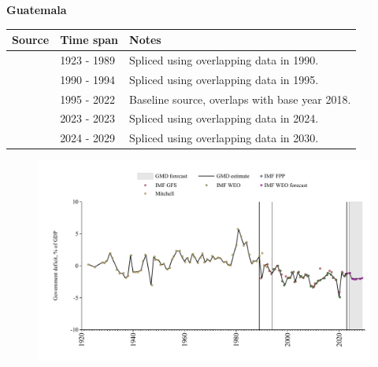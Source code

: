 \documentclass[12pt,a4paper,landscape]{article}
\begin{document}
\begin{adjustbox}{max totalsize={\paperwidth}{\paperheight},center}
\begin{minipage}[t][\textheight][t]{\textwidth}
\vspace*{0.5cm}
{}
\begin{center}
{\Large\bfseries Guatemala}
\end{center}
\vspace{0.5cm}
\begin{table}[H]
\centering
\small
\begin{tabular}{|l|l|l|}
\hline
\textbf{Source} & \textbf{Time span} & \textbf{Notes} \\
\hline
\rowcolor{white}\cite{Mitchell}& 1923 - 1989 &Spliced using overlapping data in 1990.\\
\rowcolor{lightgray}\cite{IMF_GFS}& 1990 - 1994 &Spliced using overlapping data in 1995.\\
\rowcolor{white}\cite{IMF_WEO}& 1995 - 2022 &Baseline source, overlaps with base year 2018.\\
\rowcolor{lightgray}\cite{IMF_GFS}& 2023 - 2023 &Spliced using overlapping data in 2024.\\
\rowcolor{white}\cite{IMF_WEO_forecast}& 2024 - 2029 &Spliced using overlapping data in 2030.\\
\hline
\end{tabular}
\end{table}
\begin{figure}[H]
\centering
\includegraphics[width=\textwidth,height=0.6\textheight,keepaspectratio]{graphs/GTM_govdef_GDP.pdf}
\end{figure}
\end{minipage}
\end{adjustbox}
\end{document}
